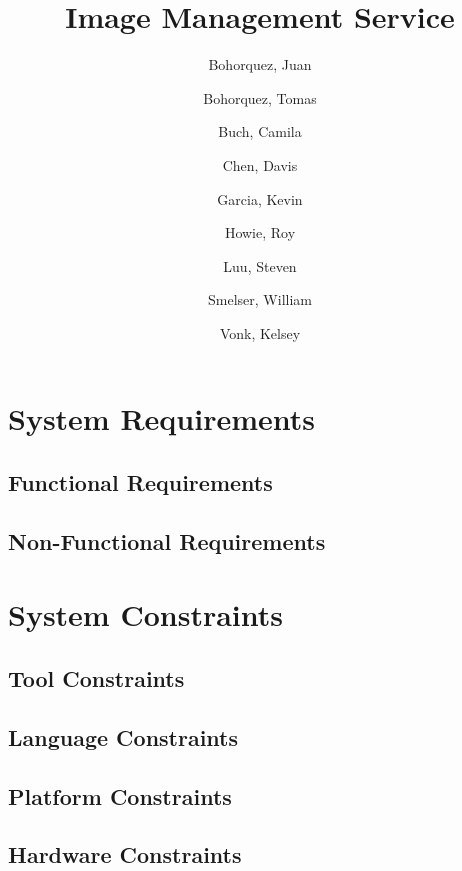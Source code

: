 \documentclass[UTF8]{article}
\begin{document}
\title{Image Management Service}
\author{
       Bohorquez, Juan %
  \and Bohorquez, Tomas %
  \and Buch, Camila %
  \and Chen, Davis %
  \and Garcia, Kevin %
  \and Howie, Roy %
  \and Luu, Steven %
  \and Smelser, William %
  \and Vonk, Kelsey %
}
\date{}
\maketitle

\clearpage
  \tableofcontents

\clearpage
  \listoffigures
  \listoftables

\clearpage

\section{System Requirements}
  \subsection{Functional Requirements}

  \subsection{Non-Functional Requirements}

\section{System Constraints}
  \subsection{Tool Constraints}

  \subsection{Language Constraints}

  \subsection{Platform Constraints}

  \subsection{Hardware Constraints}
\end{document}
